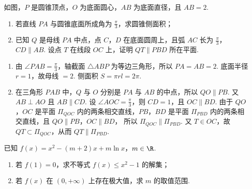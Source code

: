 \documentclass[UTF8,a4paper,oneside,11pt]{ctexbook}
\begin{document}
\begin{problem}
如图，\(P\) 是圆锥顶点，\(O\) 为底面圆心，\(AB\) 为底面直径，且 \(AB=2\).
\begin{enumerate}
\item 若直线 \(PA\) 与圆锥底面所成角为 \(\frac{\pi}{3}\)，求圆锥侧面积；
\item 已知 \(Q\) 是母线 \(PA\) 中点，点 \(C\)，\(D\) 在底面圆周上，且弧 \(AC\) 长为 \(\frac{\pi}{3}\)，\(CD\parallel AB\). 设点 \(T\) 在线段 \(OC\) 上，证明 \(QT\parallel PBD\) 所在平面.
\end{enumerate}

\end{problem}

\begin{solution}
\begin{enumerate}
\item 由 \(\angle PAB=\frac{\pi}{3}\)，轴截面 \(\triangle ABP\) 为等边三角形，所以 \(PA=AB=2\). 底面半径 \(r=1\)，故母线 \(=2\). 侧面积 \(S=\pi r l=2\pi\).

\item 在三角形 \(PAB\) 中，\(Q\) 与 \(O\) 分别是 \(PA\) 与 \(AB\) 的中点，所以
\(QO\parallel PB\).
又 \(AB\perp AO\) 且 \(AB\parallel CD\). 设 \(\angle AOC=\frac{\pi}{3}\)，则 \(CD=1\)，且
\(OC\parallel BD\).
由于 \(QO\)，\(OC\) 是平面 \(\Pi_{QOC}\) 内的两条相交直线，\(PB\)，\(BD\) 是平面 \(\Pi_{PBD}\) 内的两条相交直线，且
\(QO\parallel PB\)，\(OC\parallel BD\)，
所以
\(\Pi_{QOC}\parallel\Pi_{PBD}\).
又 \(T\in OC\)，故 \(QT\subset\Pi_{QOC}\)，从而
\(QT\parallel\Pi_{PBD}\).
\end{enumerate}
\end{solution}

\begin{problem}
已知 \(f(x)=x^2-(m+2)x+m\ln x\)，\(m\in\R\).
\begin{enumerate}
\item 若 \(f(1)=0\)，求不等式 \(f(x)\le x^2-1\) 的解集；
\item 若 \(f(x)\) 在 \((0,+\infty)\) 上存在极大值，求 \(m\) 的取值范围.
\end{enumerate}
\end{problem}
\end{document}
